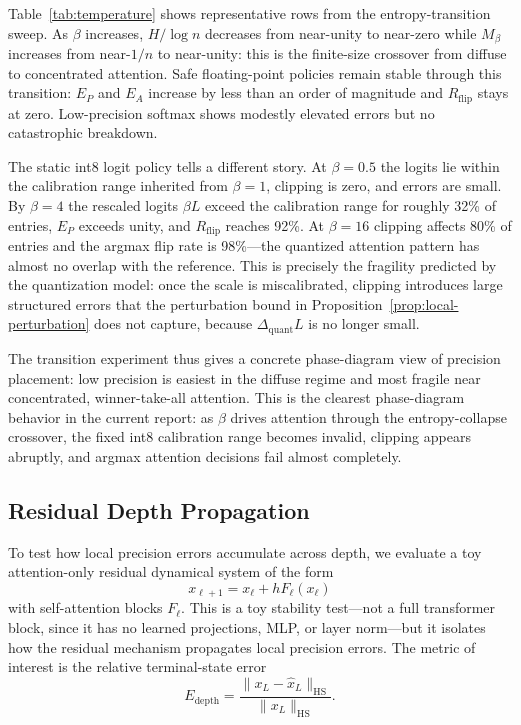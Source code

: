 Table~\ref{tab:temperature} shows representative rows from the entropy-transition sweep. As $\beta$ increases, $H/\log n$ decreases from near-unity to near-zero while $M_\beta$ increases from near-$1/n$ to near-unity: this is the finite-size crossover from diffuse to concentrated attention. Safe floating-point policies remain stable through this transition: $E_P$ and $E_A$ increase by less than an order of magnitude and $R_{\mathrm{flip}}$ stays at zero. Low-precision softmax shows modestly elevated errors but no catastrophic breakdown.

The static int8 logit policy tells a different story. At $\beta=0.5$ the logits lie within the calibration range inherited from $\beta=1$, clipping is zero, and errors are small. By $\beta=4$ the rescaled logits $\beta L$ exceed the calibration range for roughly 32\% of entries, $E_P$ exceeds unity, and $R_{\mathrm{flip}}$ reaches 92\%. At $\beta=16$ clipping affects 80\% of entries and the argmax flip rate is 98\%---the quantized attention pattern has almost no overlap with the reference. This is precisely the fragility predicted by the quantization model: once the scale is miscalibrated, clipping introduces large structured errors that the perturbation bound in Proposition~\ref{prop:local-perturbation} does not capture, because $\Delta_{\mathrm{quant}}L$ is no longer small.

The transition experiment thus gives a concrete phase-diagram view of precision placement: low precision is easiest in the diffuse regime and most fragile near concentrated, winner-take-all attention. This is the clearest phase-diagram behavior in the current report: as $\beta$ drives attention through the entropy-collapse crossover, the fixed int8 calibration range becomes invalid, clipping appears abruptly, and argmax attention decisions fail almost completely.

\subsection{Residual Depth Propagation}

To test how local precision errors accumulate across depth, we evaluate a toy attention-only residual dynamical system of the form
\[
    x_{\ell+1} = x_\ell + h F_\ell(x_\ell)
\]
with self-attention blocks $F_\ell$. This is a toy stability test---not a full transformer block, since it has no learned projections, MLP, or layer norm---but it isolates how the residual mechanism propagates local precision errors. The metric of interest is the relative terminal-state error
\[
    E_{\mathrm{depth}} = \frac{\|x_L-\widehat x_L\|_{\mathrm{HS}}}{\|x_L\|_{\mathrm{HS}}}.
\]


